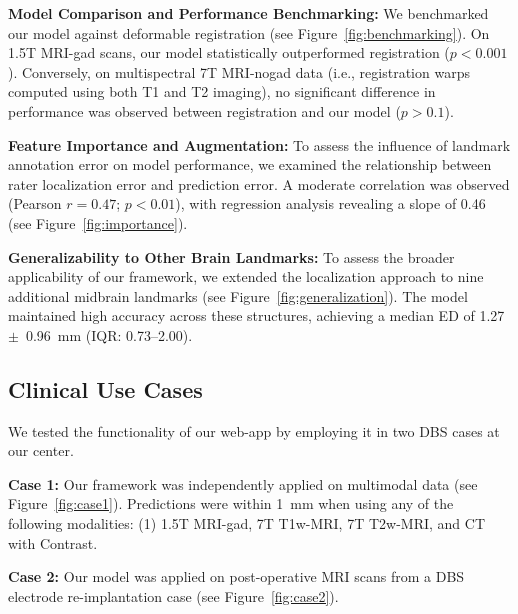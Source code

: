 \textbf{Model Comparison and Performance Benchmarking:} We benchmarked our model against deformable registration (see Figure~\ref{fig:benchmarking}). On 1.5T MRI-gad scans, our model statistically outperformed registration ($p < 0.001$). Conversely, on multispectral 7T MRI-nogad data (i.e., registration warps computed using both T1 and T2 imaging), no significant difference in performance was observed between registration and our model ($p > 0.1$).

\textbf{Feature Importance and Augmentation:} To assess the influence of landmark annotation error on model performance, we examined the relationship between rater localization error and prediction error. A moderate correlation was observed (Pearson $r = 0.47$; $p < 0.01$), with regression analysis revealing a slope of 0.46 (see Figure~\ref{fig:importance}).

\textbf{Generalizability to Other Brain Landmarks:} To assess the broader applicability of our framework, we extended the localization approach to nine additional midbrain landmarks (see Figure~\ref{fig:generalization}). The model maintained high accuracy across these structures, achieving a median ED of 1.27~$\pm$~0.96~mm (IQR: 0.73–2.00).

\subsection{Clinical Use Cases}
We tested the functionality of our web-app by employing it in two DBS cases at our center.

\textbf{Case 1:} Our framework was independently applied on multimodal data (see Figure~\ref{fig:case1}). Predictions were within 1~mm when using any of the following modalities: (1) 1.5T MRI-gad, 7T T1w-MRI, 7T T2w-MRI, and CT with Contrast.

\textbf{Case 2:} Our model was applied on post-operative MRI scans from a DBS electrode re-implantation case (see Figure~\ref{fig:case2}).

